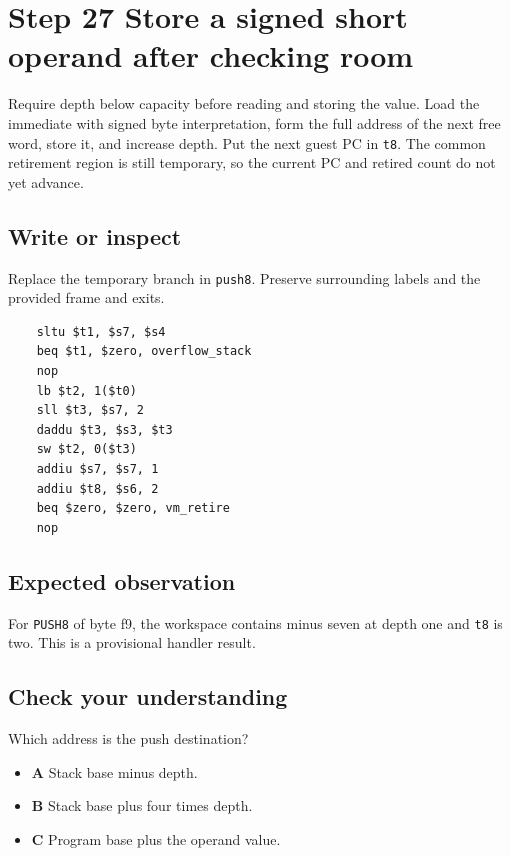 \section{Step 27 Store a signed short operand after checking room}\label{vm-s27}

Require depth below capacity before reading and storing the value. Load the immediate with signed byte interpretation, form the full address of the next free word, store it, and increase depth. Put the next guest PC in \texttt{t8}. The common retirement region is still temporary, so the current PC and retired count do not yet advance.

\subsection{Write or inspect}
Replace the temporary branch in \texttt{push8}. Preserve surrounding labels and the provided frame and exits.

\begin{verbatim}
    sltu $t1, $s7, $s4
    beq $t1, $zero, overflow_stack
    nop
    lb $t2, 1($t0)
    sll $t3, $s7, 2
    daddu $t3, $s3, $t3
    sw $t2, 0($t3)
    addiu $s7, $s7, 1
    addiu $t8, $s6, 2
    beq $zero, $zero, vm_retire
    nop
\end{verbatim}
\subsection{Expected observation}
For \texttt{PUSH8} of byte f9, the workspace contains minus seven at depth one and \texttt{t8} is two. This is a provisional handler result.

\subsection{Check your understanding}
Which address is the push destination?

\begin{itemize}
  \item \textbf{A} Stack base minus depth.
  \item \textbf{B} Stack base plus four times depth.
  \item \textbf{C} Program base plus the operand value.
\end{itemize}
